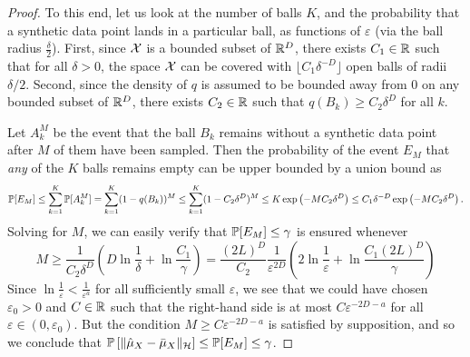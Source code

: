 \begin{lemma}
\begin{proof}
To this end, let us look at the number of balls $K$, and the probability that a synthetic data point lands in a particular ball, as functions of $\varepsilon$ (via the ball radius $\frac{\delta}{2}$). First, since $\mathcal{X}$ is a bounded subset of $\mathbb{R}^D$, there exists $C_1 \in \mathbb{R}$ such that for all $\delta > 0$, the space $\mathcal{X}$ can be covered with $\lfloor C_1 \delta^{-D} \rfloor$ open balls of radii $\delta / 2$. Second, since the density of $q$ is assumed to be bounded away from $0$ on any bounded subset of $\mathbb{R}^D$, there exists $C_2 \in \mathbb{R}$ such that $q(B_k) \geq C_2 \delta^D$ for all $k$.

Let $A_k^M$ be the event that the ball $B_k$ remains without a synthetic data point after $M$ of them have been sampled. Then the probability of the event $E_M$ that \emph{any} of the $K$ balls remains empty can be upper bounded by a union bound as
\begin{equation*}
\mathbb{P}[ E_M ]
\leq \sum_{k = 1}^K \mathbb{P}[ A_k^M ]
= \sum_{k = 1}^K (1 - q(B_k))^M
\leq \sum_{k = 1}^K (1 - C_2 \delta^D)^M
\leq K \exp\left( - M C_2 \delta^D \right)
\leq C_1 \delta^{-D} \exp\left( - M C_2 \delta^D \right)
.
\end{equation*}
Solving for $M$, we can easily verify that $\mathbb{P}[E_M] \leq \gamma$ is ensured whenever
\begin{equation*}
M
\geq
\frac{1}{C_2 \delta^D} \left( D \ln \frac{1}{\delta} + \ln \frac{C_1}{\gamma} \right)
=
\frac{(2L)^D}{C_2} \frac{1}{\varepsilon^{2D}} \left( 2 \ln \frac{1}{\varepsilon} + \ln \frac{C_1 (2L)^D}{\gamma} \right)
\end{equation*}
Since $\ln \frac{1}{\varepsilon} < \frac{1}{\varepsilon^a}$ for all sufficiently small $\varepsilon$, we see that we could have chosen $\varepsilon_0 > 0$ and $C \in \mathbb{R}$ such that the right-hand side is at most $C \varepsilon^{-2D-a}$ for all $\varepsilon \in (0, \varepsilon_0)$. But the condition $M \geq C \varepsilon^{-2D-a}$ is satisfied by supposition, and so we conclude that $\mathbb{P}\left[ \| \hat{\mu}_X - \bar{\mu}_X \|_{\mathcal{H}} \right] \leq \mathbb{P}[E_M] \leq \gamma$.
\end{proof}
\end{lemma}


